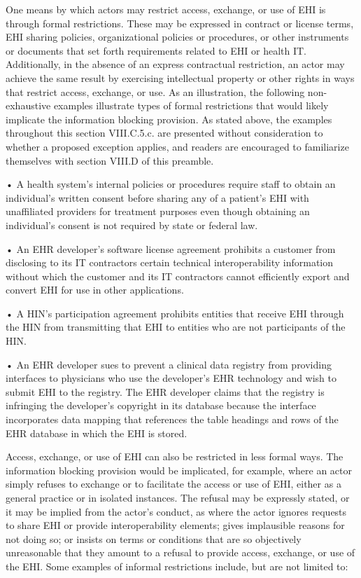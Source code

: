 \documentclass[twoside,11pt]{article}
\begin{document}
          One means by which actors may restrict access, exchange, or use of EHI is through formal restrictions. These may be expressed in contract or license terms, EHI sharing policies, organizational policies or procedures, or other instruments or documents that set forth requirements related to EHI or health IT. Additionally, in the absence of an express contractual restriction, an actor may achieve the same result by exercising intellectual property or other rights in ways that restrict access, exchange, or use. As an illustration, the following non-exhaustive examples illustrate types of formal restrictions that would likely implicate the information blocking provision. As stated above, the examples throughout this section VIII.C.5.c. are presented without consideration to whether a proposed exception applies, and readers are encouraged to familiarize themselves with section VIII.D of this preamble.


          • A health system's internal policies or procedures require staff to obtain an individual's written consent before sharing any of a patient's EHI with unaffiliated providers for treatment purposes even though obtaining an individual's consent is not required by state or federal law.


          • An EHR developer's software license agreement prohibits a customer from disclosing to its IT contractors certain technical interoperability information without which the customer and its IT contractors cannot efficiently export and convert EHI for use in other applications.


          • A HIN's participation agreement prohibits entities that receive EHI through the HIN from transmitting that EHI to entities who are not participants of the HIN.


          • An EHR developer sues to prevent a clinical data registry from providing interfaces to physicians who use the developer's EHR technology and wish to submit EHI to the registry. The EHR developer claims that the registry is infringing the developer's copyright in its database because the interface incorporates data mapping that references the table headings and rows of the EHR database in which the EHI is stored.


          Access, exchange, or use of EHI can also be restricted in less formal ways. The information blocking provision would be implicated, for example, where an actor simply refuses to exchange or to facilitate the access or use of EHI, either as a general practice or in isolated instances. The refusal may be expressly stated, or it may be implied from the actor's conduct, as where the actor ignores requests to share EHI or provide interoperability elements; gives implausible reasons for not doing so; or insists on terms or conditions that are so objectively unreasonable that they amount to a refusal to provide access, exchange, or use of the EHI. Some examples of informal restrictions include, but are not limited to:
\end{document}
